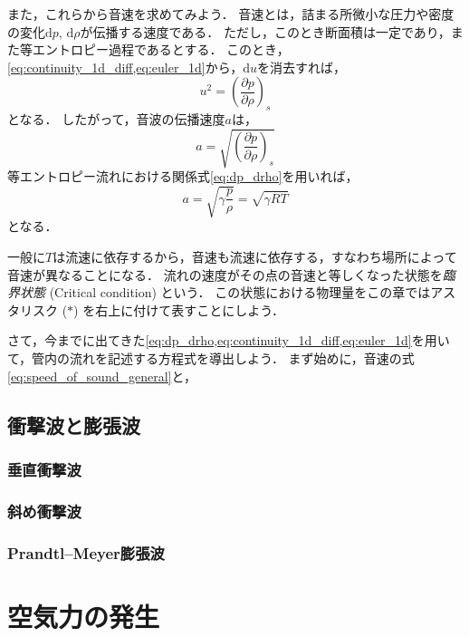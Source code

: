\documentclass[uplatex,dvipdfmx,a4j,11pt]{jsreport}
\newcommand{\diff}{\mathrm{d}} %
\numberwithin{equation}{chapter}
\begin{document}
また，これらから音速を求めてみよう．
音速とは，詰まる所微小な圧力や密度の変化$\diff p$, $\diff \rho$が伝播する速度である．
ただし，このとき断面積は一定であり，また等エントロピー過程であるとする．
このとき，\cref{eq:continuity_1d_diff,eq:euler_1d}から，$\diff u$を消去すれば，
\begin{equation*}
  u^2 = \left(\frac{\partial p}{\partial \rho}\right)_s
\end{equation*}
となる．
したがって，音波の伝播速度$a$は，
\begin{equation}
  a = \sqrt{\left(\frac{\partial p}{\partial \rho}\right)_s}
  \label{eq:speed_of_sound_general}
\end{equation}
等エントロピー流れにおける関係式\ref{eq:dp_drho}を用いれば，
\begin{equation}
  a = \sqrt{\gamma \frac{p}{\rho}} = \sqrt{\gamma RT}
  \label{eq:speed_of_sound_ideal_gas}
\end{equation}
となる．

一般に$T$は流速に依存するから，音速も流速に依存する，すなわち場所によって音速が異なることになる．
流れの速度がその点の音速と等しくなった状態を\emph{臨界状態} (Critical condition) という．
この状態における物理量をこの章ではアスタリスク ($*$) を右上に付けて表すことにしよう．


\enskip

さて，今までに出てきた\cref{eq:dp_drho,eq:continuity_1d_diff,eq:euler_1d}を用いて，管内の流れを記述する方程式を導出しよう．
まず始めに，音速の式\cref{eq:speed_of_sound_general}と，

\section{衝撃波と膨張波}

\subsection{垂直衝撃波}

\subsection{斜め衝撃波}

\subsection{Prandtl--Meyer膨張波}



\chapter{空気力の発生}
\end{document}

